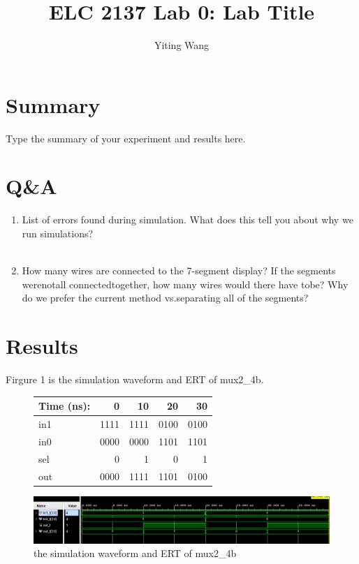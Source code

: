 \documentclass[11pt]{article}
\begin{document}
\title{ELC 2137 Lab 0: Lab Title}
\author{Yiting Wang}

\maketitle


\section*{Summary}

Type the summary of your experiment and results here.  


\section*{Q\&A}

\begin{enumerate}
	\item List  of  errors  found  during  simulation.   What does this tell you about why we run simulations? \\
	 \\
	\item How many wires are connected to the 7-segment display?  If the segments werenotall connectedtogether,  how  many  wires  would  there  have  tobe?   Why  do  we  prefer  the  current  method  vs.separating all of the segments?\\
\end{enumerate}




\section*{Results}

	Firgure 1 is the simulation waveform and ERT of mux2_4b.\\
	\begin{figure}[ht]\centering
		\begin{tabular}{l|rrrr}
			Time (ns): & 0 & 10 & 20 & 30 \\
			\midrule
			in1 & 1111 & 1111 & 0100 & 0100 \\
			in0 & 0000 & 0000 & 1101 & 1101 \\
			sel & 0 & 1 & 0 & 1 \\
			\midrule
			out & 0000 & 1111 & 1101 & 0100 \\
			\bottomrule
		\end{tabular}\medskip
		
		\includegraphics[width=1\textwidth]{mux2_4b_simulation}
		\caption{the simulation waveform and ERT of mux2_4b}
		\label{fig:mux2_4b_simulation}
	\end{figure}
	
\end{document}
